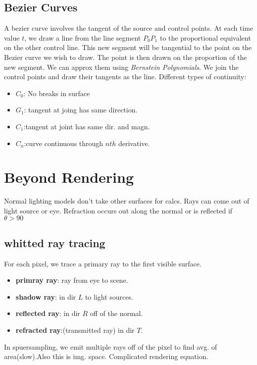 \documentclass[landscape,4pt,a4paper]{article}
\begin{document}
\begin{multicols*}{5}
			\subsection{Bezier Curves}
				A bezier curve involves the tangent of the source and control points. At each time value $t$, we draw a line 
				from the line segment $P_{0}P_{1}$ to the proportional equivalent on the other control line. This new segment
				will be tangential to the point on the Bezier curve we wish to draw. The point is then drawn on the proportion
				of the new segment. We can approx them using \textit{Bernstein Polynomials}. We join the control points and draw
				their tangents as the line. Different types of continuity:
				\begin{itemize}
						\item{$C_{0}$}: No breaks in surface
						\item{$G_{1}$}: tangent at joing has same direction.
						\item{$C_{1}$}:tangent at joint has same dir. and magn.
						\item{$C_{n}$}:curve continuous through $nth$ derivative.
				\end{itemize}
	\section{Beyond Rendering}
			Normal lighting models don't take other surfaces for calcs. Rays can come out of light source or eye.
			Refraction occurs out along the normal or is reflected if $\theta>90$
			\subsection{whitted ray tracing}
				For each pixel, we trace a primary ray to the first visible surface.
				\begin{itemize}
					\item{\textbf{primray ray}}: ray from eye to scene.
					\item{\textbf{shadow ray}}: in dir $L$ to light sources.
					\item{\textbf{reflected ray}}: in dir $R$ off of the normal.	
					\item{\textbf{refracted ray}}:(transmitted ray) in dir $T$.
				\end{itemize}
				In spuersampling, we emit multiple rays off of the pixel to find avg. of area(slow).Also this is img. space.
				Complicated rendering equation.

\end{multicols*}
\end{document}
